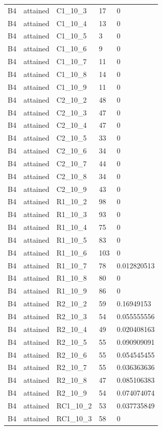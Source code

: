 \begin{longtable}{lllll}
B4 & attained & C1\_10\_3 & 17 & 0 \\
B4 & attained & C1\_10\_4 & 13 & 0 \\
B4 & attained & C1\_10\_5 & 3 & 0 \\
B4 & attained & C1\_10\_6 & 9 & 0 \\
B4 & attained & C1\_10\_7 & 11 & 0 \\
B4 & attained & C1\_10\_8 & 14 & 0 \\
B4 & attained & C1\_10\_9 & 11 & 0 \\
B4 & attained & C2\_10\_2 & 48 & 0 \\
B4 & attained & C2\_10\_3 & 47 & 0 \\
B4 & attained & C2\_10\_4 & 47 & 0 \\
B4 & attained & C2\_10\_5 & 33 & 0 \\
B4 & attained & C2\_10\_6 & 34 & 0 \\
B4 & attained & C2\_10\_7 & 44 & 0 \\
B4 & attained & C2\_10\_8 & 34 & 0 \\
B4 & attained & C2\_10\_9 & 43 & 0 \\
B4 & attained & R1\_10\_2 & 98 & 0 \\
B4 & attained & R1\_10\_3 & 93 & 0 \\
B4 & attained & R1\_10\_4 & 75 & 0 \\
B4 & attained & R1\_10\_5 & 83 & 0 \\
B4 & attained & R1\_10\_6 & 103 & 0 \\
B4 & attained & R1\_10\_7 & 78 & 0.012820513 \\
B4 & attained & R1\_10\_8 & 80 & 0 \\
B4 & attained & R1\_10\_9 & 86 & 0 \\
B4 & attained & R2\_10\_2 & 59 & 0.16949153 \\
B4 & attained & R2\_10\_3 & 54 & 0.055555556 \\
B4 & attained & R2\_10\_4 & 49 & 0.020408163 \\
B4 & attained & R2\_10\_5 & 55 & 0.090909091 \\
B4 & attained & R2\_10\_6 & 55 & 0.054545455 \\
B4 & attained & R2\_10\_7 & 55 & 0.036363636 \\
B4 & attained & R2\_10\_8 & 47 & 0.085106383 \\
B4 & attained & R2\_10\_9 & 54 & 0.074074074 \\
B4 & attained & RC1\_10\_2 & 53 & 0.037735849 \\
B4 & attained & RC1\_10\_3 & 58 & 0 \\

\end{longtable}

